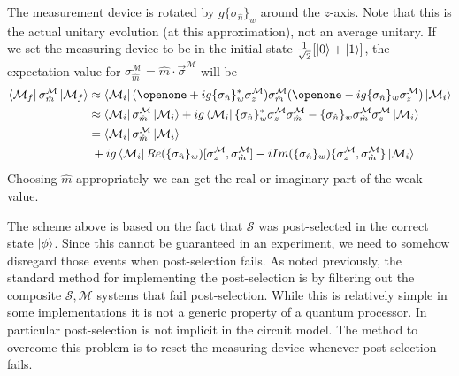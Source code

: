 \documentclass[aps,pra,12pt,onecolumn,showpacs,superscriptaddress,floatfix,footinbib,subfigure]{revtex4}
\def\bra#1{\mathinner{\langle{#1}|}}
\def\ket#1{\mathinner{|{#1}\rangle}}
\def\es{{\mathcal{S}}}
\def\md{{\mathcal{M}}}
\def\sm{{\es,\md}}
\def\sn{ \sigma_{ \hat{n} } }
\begin{document}
The measurement device is rotated by $g\{\sigma_{\hat{n}}\}_w$ around the $z$-axis.  Note that this is the actual unitary evolution (at this approximation), not an average unitary.  If we set the measuring device to be in the initial state $\frac{1}{\sqrt{2}}[\ket{0}+\ket{1}]$,  the  expectation value for $\sigma_{\hat{m}}^\md=\hat{m}\cdot\vec{\sigma}^\md$ will be
\begin{align}\label{readout}
\bra{\md_f}\sigma_{\hat{m}}^\md\ket{\md_f}&\approx\bra{\md_i}(\openone+ig\{\sn\}_w^*\sigma_z^\md)\sigma_{\hat{m}}^\md(\openone-ig\{\sn\}_w\sigma_z^\md)\ket{\md_i}\\&\approx\bra{\md_i}\sigma_{\hat{m}}^\md\ket{\md_i}+ig\bra{\md_i}\{\sn\}_w^*\sigma_z^\md\sigma_{\hat{m}}^\md-\{\sn\}_w\sigma_{\hat{m}}^\md\sigma_z^\md\ket{\md_i}\\
\label{ReIm}&=\bra{\md_i}\sigma_{\hat{m}}^\md\ket{\md_i}\\&\;+ig\bra{\md_i}Re(\{\sn\}_w)[\sigma_z^\md,\sigma_{\hat{m}}^\md]-iIm(\{\sn\}_w)\{\sigma_z^\md,\sigma_{\hat{m}}^\md\}\ket{\md_i}\nonumber
\end{align}
Choosing $\hat{m}$ appropriately we can get  the real or imaginary part of the weak value.

The scheme above is based on the fact that $\es$ was post-selected in the correct state $\ket{\phi}$. Since this cannot be guaranteed in an experiment, we need to somehow disregard those events when post-selection fails.  As noted previously, the standard method for implementing the post-selection is by filtering out the composite $\sm$ systems that fail post-selection. While this is relatively simple in some  implementations  it  is not a generic property of a quantum processor. In particular post-selection is not implicit in the circuit model. The method to overcome this problem  is to reset the measuring device whenever post-selection fails.
\end{document}
